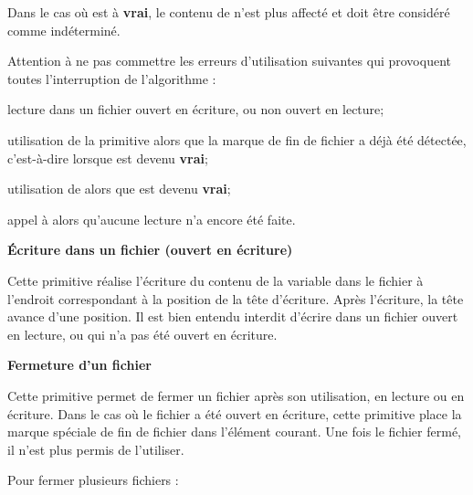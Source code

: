 Dans le cas où  est à
\textbf{vrai}, le contenu de 
 n’est plus affecté et doit être
considéré comme indéterminé.

Attention à ne pas commettre les erreurs d’utilisation suivantes qui
provoquent toutes l’interruption de l’algorithme :

\begin{liste}
	\item 
		lecture dans un fichier ouvert en écriture, ou non ouvert en lecture;
	\item 
		utilisation de la primitive  alors que la marque de
		fin de fichier a déjà été détectée, c’est-à-dire lorsque
		 est devenu \textbf{vrai};
	\item 
		utilisation de  alors que
		 est devenu \textbf{vrai};
	\item 
		appel à  alors
		qu'aucune lecture n'a encore été faite.
\end{liste}

{\sffamily\bfseries
Écriture dans un fichier (ouvert en écriture) }


Cette primitive réalise l’écriture du contenu de la variable
 dans le fichier
 à l’endroit correspondant à la position
de la tête d’écriture. Après l’écriture, la tête avance d’une position.
Il est bien entendu interdit d’écrire dans un fichier ouvert en
lecture, ou qui n’a pas été ouvert en écriture. 

{\sffamily\bfseries\upshape
Fermeture d’un fichier }


Cette primitive permet de fermer un fichier après son utilisation, en
lecture ou en écriture. Dans le cas où le fichier a été ouvert en
écriture, cette primitive place la marque spéciale de fin de fichier
dans l’élément courant. Une fois le fichier fermé, il
n'est plus permis de l'utiliser.

Pour fermer plusieurs fichiers :

